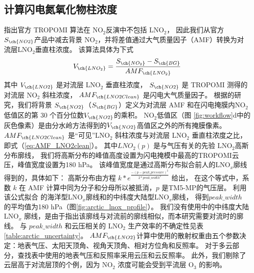 \subsection*{计算闪电氮氧化物柱浓度}

\citet{Zhang.2022a}指出官方 TROPOMI 算法在 NO$_2$反演中不包括 LNO$_2$，
因此我们从官方 $S_{\ch{NO2}}$产品中减去背景 NO$_2$，并将差值通过大气质量因子（AMF）转换为对流层LNO$_2$垂直柱浓度。
该算法具体为下式
\begin{equation} \label{eq:arctic_LNO2}
V_{\ch{LNO_2}} = \frac{S_{\ch{NO_2}} - S_{\ch{BG}}}{AMF_{\ch{LNO_2}}}
\end{equation}
其中 $V_{\ch{LNO2}}$ 是对流层 LNO$_2$ 垂直柱浓度，
$S_{\ch{NO2}}$ 是 TROPOMI 测得的对流层 NO$_2$ 斜柱浓度，
$AMF_{\ch{LNO2Clean}}$ 是闪电大气质量因子。
根据\citet{Allen.2021a}的研究，我们将背景 $S_{\ch{NO2}}$（$S_{\ch{BG}}$）定义为对流层 AMF 和在闪电掩膜内NO$_2$低值区的第 30 个百分位数$V_{\ch{NO2}}$的乘积。
NO$_2$低值区（图 \ref{fig:workflow}d中的灰色像素）是由分水岭方法得到的$V_{\ch{NO2}}$高值区之外的所有掩膜像素。
$AMF_{\ch{LNO2Clean}}$ 是“可见”LNO$_2$ 斜柱浓度与对流层 LNO$_2$ 垂直柱浓度之比，即式（\ref{eq:AMF_LNO2clean}）。
其中$LNO_2(p)$ 是与气压有关的先验 LNO$_2$高斯分布廓线，
我们将高斯分布的峰值高度设置为闪电掩模中最高的TROPOMI云压，峰值宽度设置为180 hPa。
该峰值宽度是通过高斯分布拟合前人的LNO$_x$廓线得到的，具体如下：
高斯分布由方程 $k*e^\frac{{-{(p - peak\_pressure)}^2}}{2*peak\_width^{2}}$ 给出，
在这个等式中，系数 $k$ 在 AMF 计算中同为分子和分母所以被抵消，$p$ 是TM5-MP的气压层。
利用该公式拟合 \citet{Ott.2010} 的海洋型LNO$_x$廓线和\citet{Luo.2017}的中纬度大陆型LNO$_x$廓线，
得到$peak\_width$ 的平均值为180 hPa（图\ref{fig:arctic_lnox_profile}）。
我们没有使用\citet{Ott.2010}中的中纬度大陆 LNO$_x$ 廓线，是由于\citet{Luo.2017}指出该廓线与对流前的廓线相似，而本研究需要对流时的廓线。
与 $peak\_width$ 和云压相关的 LNO$_2$ 生产效率的不确定性见表\ref{table:arctic_uncertainty}。
$AMF_{\ch{LNO2}}$计算中使用的散射权重由五个参数决定：地表气压、太阳天顶角、视角天顶角、相对方位角和反照率。
对于多云部分，查找表中使用的地表气压和反照率采用云压和云反照率。
此外，我们剔除了云层高于对流层顶的个例，因为 NO$_2$ 浓度可能会受到平流层 O$_3$ 的影响\citep{Frey.2015a,Zhang.2022a}。



